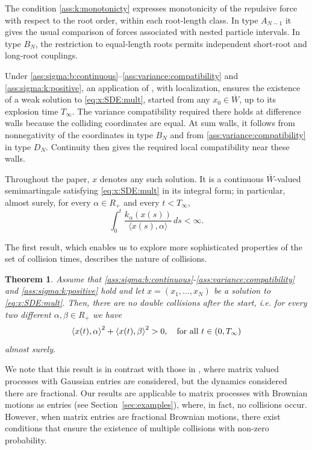 \documentclass{article}
\numberwithin{equation}{section}
\newcommand{\Cc}{\overline{W}}
\newcommand{\xta}{\left<x(t),\alpha\right>}
\newcommand{\xtb}{\left<x(t),\beta\right>}
\newcommand{\lifetime}{T_\infty}
\theoremstyle{plain}
\newtheorem{theorem}{Theorem}
\begin{document}
        The condition \ref{ass:k:monotonicty} expresses monotonicity of the repulsive force with respect to the root order, within each root-length class. In type $A_{N-1}$ it gives the usual comparison of forces associated with nested particle intervals. In type $B_N$, the restriction to equal-length roots permits independent short-root and long-root couplings.
    
    Under \ref{ass:sigma:b:continuous}--\ref{ass:variance:compatibility} and \ref{ass:sigma:k:positive}, an application of \cite[Theorem~1]{Malecki25}, with localization, ensures the existence of a weak solution to \eqref{eq:x:SDE:mult}, started from any $x_0\in\Cc$, up to its explosion time $T_\infty$. The variance compatibility required there holds at difference walls because the colliding coordinates are equal. At sum walls, it follows from nonnegativity of the coordinates in type $B_N$ and from \ref{ass:variance:compatibility} in type $D_N$. Continuity then gives the required local compatibility near these walls.

    Throughout the paper, $x$ denotes any such solution. It is a continuous $\Cc$-valued semimartingale satisfying \eqref{eq:x:SDE:mult} in its integral form; in particular, almost surely, for every $\alpha\in R_+$ and every $t<T_\infty$,
        \begin{equation*}
            \int_0^t \frac{k_\alpha(x(s))}{\langle x(s),\alpha\rangle}\,ds <\infty.
        \end{equation*}

The first result, which enables us to explore more sophisticated properties of the set of collision times, describes the nature of collisions. 

\begin{theorem}
    \label{th:multiplecollisions}
    Assume that \ref{ass:sigma:b:continuous}-\ref{ass:variance:compatibility} and \ref{ass:sigma:k:positive} hold and let $x=(x_1,\ldots,x_N)$ be a solution to \eqref{eq:x:SDE:mult}. Then, there are no double collisions after the start, i.e. for every two different $\alpha,\beta \in R_+$ we have
	   \begin{equation*}
	        \xta^2+\xtb^2>0\/,\quad \textrm{for all $t\in(0,\lifetime)$}
	   \end{equation*}
    almost surely.
\end{theorem}

We note that this result is in contrast with those in \cite{Yuan24}, where matrix valued processes with Gaussian entries are considered, but the dynamics considered there are fractional.
Our results are applicable to matrix processes with Brownian motions as entries (see Section~\ref{sec:examples}), where, in fact, no collisions occur.
However, when matrix entries are fractional Brownian motions, there exist conditions that ensure the existence of multiple collisions with non-zero probability.
\end{document}
